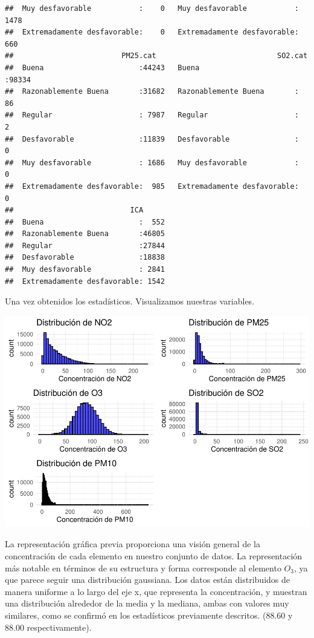 \documentclass[notspecified,article,submit,moreauthors,pdftex]{Definitions/mdpi}
\begin{document}
\begin{verbatim}
##  Muy desfavorable           :    0   Muy desfavorable           : 1478  
##  Extremadamente desfavorable:    0   Extremadamente desfavorable:  660  
##                         PM25.cat                            SO2.cat     
##  Buena                      :44243   Buena                      :98334  
##  Razonablemente Buena       :31682   Razonablemente Buena       :   86  
##  Regular                    : 7987   Regular                    :    2  
##  Desfavorable               :11839   Desfavorable               :    0  
##  Muy desfavorable           : 1686   Muy desfavorable           :    0  
##  Extremadamente desfavorable:  985   Extremadamente desfavorable:    0  
##                           ICA       
##  Buena                      :  552  
##  Razonablemente Buena       :46805  
##  Regular                    :27844  
##  Desfavorable               :18838  
##  Muy desfavorable           : 2841  
##  Extremadamente desfavorable: 1542
\end{verbatim}

Una vez obtenidos los estadísticos. Visualizamos nuestras variables.

\includegraphics{ProyectoAED2023_files/figure-latex/unnamed-chunk-20-1.pdf}

La representación gráfica previa proporciona una visión general de la
concentración de cada elemento en nuestro conjunto de datos. La
representación más notable en términos de su estructura y forma
corresponde al elemento \(O_{3}\), ya que parece seguir una distribución
gaussiana. Los datos están distribuidos de manera uniforme a lo largo
del eje x, que representa la concentración, y muestran una distribución
alrededor de la media y la mediana, ambas con valores muy similares,
como se confirmó en los estadísticos previamente descritos. (88.60 y
88.00 respectivamente).
\end{document}
